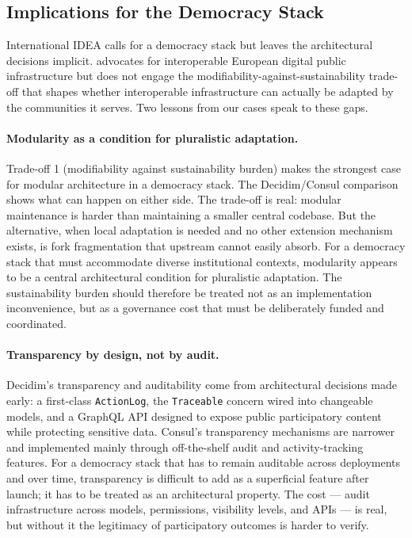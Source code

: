 \documentclass[11pt,a4paper]{article}
\begin{document}
\subsection{Implications for the Democracy Stack}\label{sec:disc-stack}

International IDEA \citeyearpar{idea2026democracy} calls for a democracy stack but leaves the architectural decisions implicit. \citet{ceps2025building} advocates for interoperable European digital public infrastructure but does not engage the modifiability-against-sustainability trade-off that shapes whether interoperable infrastructure can actually be adapted by the communities it serves. Two lessons from our cases speak to these gaps.

\paragraph{Modularity as a condition for pluralistic adaptation.}
Trade-off 1 (modifiability against sustainability burden) makes the strongest case for modular architecture in a democracy stack. The Decidim/Consul comparison shows what can happen on either side. The trade-off is real: modular maintenance is harder than maintaining a smaller central codebase. But the alternative, when local adaptation is needed and no other extension mechanism exists, is fork fragmentation that upstream cannot easily absorb. For a democracy stack that must accommodate diverse institutional contexts, modularity appears to be a central architectural condition for pluralistic adaptation. The sustainability burden should therefore be treated not as an implementation inconvenience, but as a governance cost that must be deliberately funded and coordinated.

\paragraph{Transparency by design, not by audit.}
Decidim's transparency and auditability come from architectural decisions made early: a first-class \texttt{ActionLog}, the \texttt{Traceable} concern wired into changeable models, and a GraphQL API designed to expose public participatory content while protecting sensitive data. Consul's transparency mechanisms are narrower and implemented mainly through off-the-shelf audit and activity-tracking features. For a democracy stack that has to remain auditable across deployments and over time, transparency is difficult to add as a superficial feature after launch; it has to be treated as an architectural property. The cost --- audit infrastructure across models, permissions, visibility levels, and APIs --- is real, but without it the legitimacy of participatory outcomes is harder to verify.
\end{document}
